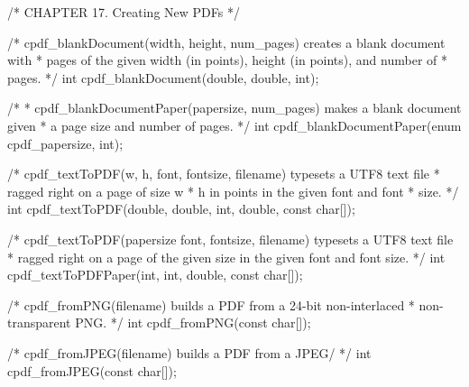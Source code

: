 /* CHAPTER 17. Creating New PDFs */

/* cpdf_blankDocument(width, height, num_pages) creates a blank document with
 * pages of the given width (in points), height (in points), and number of
 * pages.
 */
int cpdf_blankDocument(double, double, int);

/*
 * cpdf_blankDocumentPaper(papersize, num_pages) makes a blank document given
 * a page size and number of pages.
 */
int cpdf_blankDocumentPaper(enum cpdf_papersize, int);

/* cpdf_textToPDF(w, h, font, fontsize, filename) typesets a UTF8 text file
 * ragged right on a page of size w * h in points in the given font and font
 * size. */
int cpdf_textToPDF(double, double, int, double, const char[]);

/* cpdf_textToPDF(papersize font, fontsize, filename) typesets a UTF8 text file
 * ragged right on a page of the given size in the given font and font size. */
int cpdf_textToPDFPaper(int, int, double, const char[]);

/* cpdf_fromPNG(filename) builds a PDF from a 24-bit non-interlaced
 * non-transparent PNG. */
int cpdf_fromPNG(const char[]);

/* cpdf_fromJPEG(filename) builds a PDF from a JPEG/ */
int cpdf_fromJPEG(const char[]);

